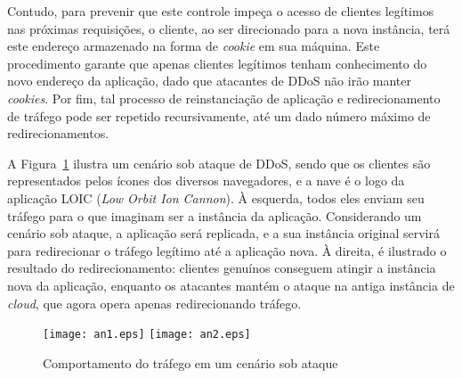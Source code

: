 Contudo, para prevenir que este controle impeça o acesso de clientes legítimos nas próximas requisições, o cliente, ao ser direcionado para a nova instância, terá este endereço armazenado na forma de \emph{cookie} em sua máquina. Este procedimento garante que apenas clientes legítimos tenham conhecimento do novo endereço da aplicação, dado que atacantes de DDoS não irão manter \emph{cookies}. Por fim,  tal processo de reinstanciação de aplicação e redirecionamento de tráfego pode ser repetido recursivamente, até um dado número máximo de redirecionamentos.

A Figura~\ref{fig:cen} ilustra um cenário sob ataque de DDoS, sendo que os clientes são representados pelos ícones dos diversos navegadores, e a nave é o logo da aplicação LOIC (\emph{Low Orbit Ion Cannon}). À esquerda, todos eles enviam seu tráfego para o que imaginam ser a instância da aplicação. Considerando um cenário sob ataque, a aplicação será replicada, e a sua instância original servirá para redirecionar o tráfego legítimo até a aplicação nova. À direita, é ilustrado o resultado do redirecionamento: clientes genuínos conseguem atingir a instância nova da aplicação, enquanto os atacantes mantém o ataque na antiga instância de \emph{cloud}, que agora opera apenas redirecionando tráfego.


\begin{figure}[t!]
	\centering
	\texttt{[image: an1.eps]}
	\hskip 1cm
	\texttt{[image: an2.eps]}
	\caption{Comportamento do tráfego em um cenário sob ataque}
	\label{fig:cen}
\end{figure}